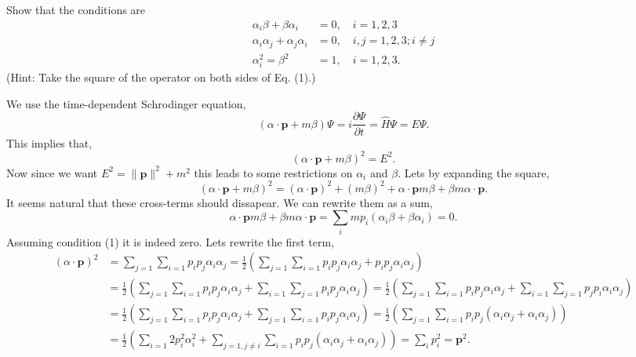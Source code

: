 \documentclass[working, oneside]{../../../Preambles/tuftebook}
\begin{document}
\begin{subexercise}{1}
Show that the conditions are
\begin{align}
\alpha_i \beta + \beta \alpha_i &= 0, \quad i = 1, 2, 3  \\
\alpha_i \alpha_j + \alpha_j \alpha_i &= 0, \quad i, j = 1, 2, 3; i \neq j  \\
\alpha_i^2 = \beta^2 &= 1, \quad i = 1, 2, 3. 
\end{align}
(Hint: Take the square of the operator on both sides of Eq. (1).)
\end{subexercise}
\begin{solution}
We use the time-dependent Schrodinger equation,
\[
\left( \alpha\cdot \mathbf{p}+m\beta \right) \Psi =i \frac{\partial \Psi}{\partial t} = \hat{H}\Psi = E\Psi
.\] 
This implies that,
\[
\left( \alpha\cdot \mathbf{p }+ m\beta \right) ^2 = E^2
.\] 
Now since we want $E^2 = \|\mathbf{p}\|^2 + m^2$ this leads to some restrictions on $\alpha_i$ and $\beta$. Lets by expanding the square,
\[
\left( \alpha\cdot \mathbf{p} + m\beta \right)^2 = \left( \alpha\cdot \mathbf{p} \right) ^2 + \left( m\beta \right) ^2 + \alpha\cdot \mathbf{p}m\beta +\beta m \alpha \cdot \mathbf{p}
.\] 
It seems natural that these cross-terms should dissapear. We can rewrite them as a sum,
\[
\alpha\cdot \mathbf{p}m\beta +\beta m \alpha \cdot \mathbf{p} = \sum_i mp_i \left( \alpha_i \beta + \beta \alpha_i \right) = 0
.\] 
Assuming condition (1) it is indeed zero. Lets rewrite the first term,
\begin{align*}
    \left( \alpha \cdot \mathbf{p} \right) ^2 &= \sum_{j=1}\sum_{i=1} p_ip_j\alpha_i\alpha_j = \frac{1}{2} \left(\sum_{j=1}\sum_{i=1} p_ip_j\alpha_i\alpha_j + p_ip_j\alpha_i\alpha_j\right) \\
    &=  \frac{1}{2} \left( \sum_{j=1}\sum_{i=1} p_ip_j\alpha_i\alpha_j + \sum_{i=1}\sum_{j=1}p_ip_j\alpha_i\alpha_j\right) = \frac{1}{2} \left( \sum_{j=1}\sum_{i=1} p_ip_j\alpha_i\alpha_j + \sum_{i=1}\sum_{j=1}p_jp_i\alpha_i\alpha_j\right) \\
    &=  \frac{1}{2} \left( \sum_{j=1}\sum_{i=1} p_ip_j\alpha_i\alpha_j + \sum_{j=1}\sum_{i=1}p_ip_j\alpha_i\alpha_j\right) = \frac{1}{2} \left( \sum_{j=1}\sum_{i=1} p_ip_j\left(   \alpha_i\alpha_j + \alpha_i\alpha_j\right)\right) \\
    &=  \frac{1}{2} \left( \sum_{i=1} 2p_i^2\alpha_i^2 + \sum_{j=1, j\neq i}\sum_{i=1} p_ip_j\left(   \alpha_i\alpha_j + \alpha_i\alpha_j\right)\right) = \sum_ip_i^2 = \mathbf{p}^2
.\end{align*}
\end{solution}
\end{document}

